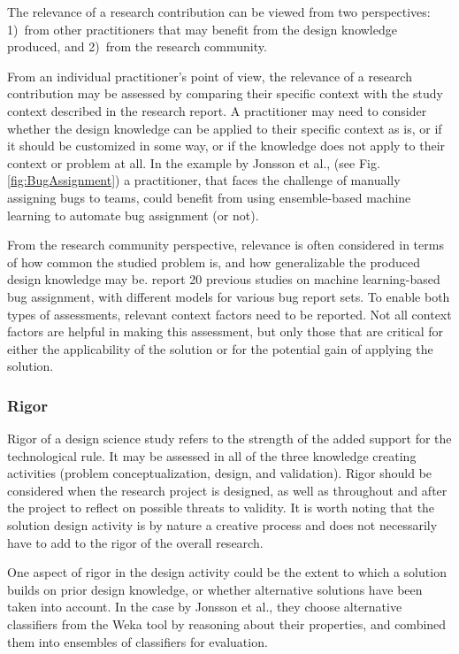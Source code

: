\documentclass[graybox]{svmult}
\newcommand{\peggy}[1]{\textcolor{blue}{{\it [Peggy says: #1]}}}
\newcommand{\peggy}[1]{}
\begin{document}
The relevance of a research contribution can be viewed from two perspectives: 1)~from other practitioners that may benefit from the design knowledge produced, and 2)~from the research community. 

From an individual practitioner's point of view, the relevance of a research contribution may be assessed by comparing their specific context with the study context described in the research report. 
A practitioner may need to consider whether the design knowledge can be applied to their specific context as is, or if it should be customized in some way, or if the knowledge does not apply to their context or problem at all.
In the example by Jonsson et al., (see Fig.\ref{fig:BugAssignment}) a practitioner, that faces the challenge of manually assigning bugs to teams, could benefit from using ensemble-based machine learning to automate bug assignment (or not). 

From the research community perspective, relevance is often considered in terms of how common the studied problem is, and how generalizable the produced design knowledge may be. \cite{JonssonBug15} report 20 previous studies on machine learning-based bug assignment, with different models for various bug report sets. To enable both types of assessments, relevant context factors need to be reported. Not all context factors are helpful in making this assessment, but only those that are critical for either the applicability of the solution or for the potential gain of applying the solution. 


\subsubsection{Rigor} 
Rigor of a design science study refers to the strength of the added support for the technological rule. It may be assessed in all of the three knowledge creating activities (problem conceptualization, design, and validation). 
Rigor should be considered when the research project is designed, as well as throughout and after the project to reflect on possible threats to validity. 
It is worth noting that the solution design activity is by nature a creative process and does not necessarily have to add to the rigor of the overall research. 

One aspect of rigor in the design activity could be the extent to which a solution builds on prior design knowledge, or whether alternative solutions have been taken into account. 
In the case by Jonsson et al., they choose alternative classifiers from the Weka tool by reasoning about their properties, and combined them into ensembles of classifiers for evaluation.
\end{document}
